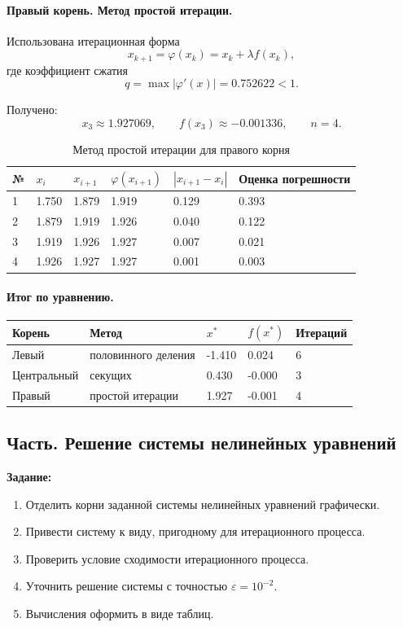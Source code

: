 \documentclass[12pt,a4paper]{article}
\begin{document}
\paragraph{Правый корень. Метод простой итерации.}
Использована итерационная форма
\[
x_{k+1} = \varphi(x_k) = x_k + \lambda f(x_k),
\]
где коэффициент сжатия
\[
q = \max |\varphi'(x)| = 0.752622 < 1.
\]

Получено:
\[
x_3 \approx 1.927069,\qquad f(x_3) \approx -0.001336,\qquad n = 4.
\]

\begin{table}[H]
  \centering
  \caption{Метод простой итерации для правого корня}
  \begin{tabular}{C{10mm}C{18mm}C{18mm}C{24mm}C{24mm}C{28mm}}
    \toprule
    № & $x_i$ & $x_{i+1}$ & $\varphi(x_{i+1})$ & $|x_{i+1}-x_i|$ & Оценка погрешности \\
     & 1.750 & 1.879 & 1.919 & 0.129 & 0.393 \\
    2 & 1.879 & 1.919 & 1.926 & 0.040 & 0.122 \\
    3 & 1.919 & 1.926 & 1.927 & 0.007 & 0.021 \\
    4 & 1.926 & 1.927 & 1.927 & 0.001 & 0.003 \\
    \bottomrule
  \end{tabular}
\end{table}

\paragraph{Итог по уравнению.}
\begin{center}
  \begin{tabular}{C{28mm}C{42mm}C{22mm}C{22mm}C{18mm}}
    \toprule
    Корень & Метод & $x^*$ & $f(x^*)$ & Итераций \\
    \midrule
    Левый & половинного деления & -1.410 & 0.024 & 6 \\
    Центральный & секущих & 0.430 & -0.000 & 3 \\
    Правый & простой итерации & 1.927 & -0.001 & 4 \\
    \bottomrule
  \end{tabular}
\end{center}

\subsection{Часть. Решение системы нелинейных уравнений}

\textbf{Задание:}
\begin{enumerate}[label=\arabic*., leftmargin=1.2cm]
  \item Отделить корни заданной системы нелинейных уравнений графически.
  \item Привести систему к виду, пригодному для итерационного процесса.
  \item Проверить условие сходимости итерационного процесса.
  \item Уточнить решение системы с точностью $\varepsilon = 10^{-2}$.
  \item Вычисления оформить в виде таблиц.
\end{enumerate}
\end{document}
